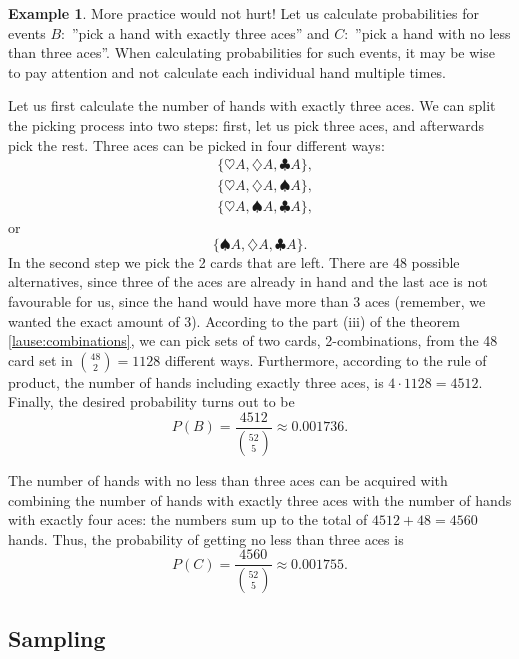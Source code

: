 \documentclass[12pt,a4paper,leqno]{report}
\theoremstyle{plain}
\theoremstyle{definition}
\newtheorem{esim}[equation]{Example}
\begin{document}
\begin{esim}
\label{esim:aces}
More practice would not hurt! Let us calculate probabilities for events $B:$ ''pick a hand with exactly three aces'' and $C:$ ''pick a hand with no less than three aces''. When calculating probabilities for such events, it may be wise to pay attention and not calculate each individual hand multiple times.

Let us first calculate the number of hands with exactly three aces. We can split the picking process into two steps: first, let us pick three aces, and afterwards pick the rest. Three aces can be picked in four different ways:
\[
\begin{split}
&\{\heartsuit A,\diamondsuit A, \clubsuit A\}, \\
&\{\heartsuit A,\diamondsuit A, \spadesuit A\}, \\
&\{\heartsuit A,\spadesuit A, \clubsuit A\}, 
\end{split}
\]
or
\[
\{\spadesuit A,\diamondsuit A, \clubsuit A\}.
\]
In the second step we pick the 2 cards that are left. There are 48 possible alternatives, since three of the aces are already in hand and the last ace is not favourable for us, since the hand would have more than  3 aces (remember, we wanted the exact amount of 3). According to the part (iii) of the theorem \ref{lause:combinations}, we can pick sets of two cards, 2-combinations, from the 48 card set in $\binom{48}{2} = 1128$ different ways. Furthermore, according to the rule of product, the number of hands including exactly three aces, is $4 \cdot 1128 = 4512$. Finally, the desired probability turns out to be 
\[
P(B) = \frac{4512}{\binom{52}{5}} \approx 0.001736.
\]

The number of hands with no less than three aces can be acquired with combining the number of hands with exactly three aces with the number of hands with exactly four aces: the numbers sum up to the total of $4512 + 48 = 4560$ hands. Thus, the probability of getting no less than three aces is
\[
P(C) = \frac{4560}{\binom{52}{5}} \approx 0.001755.
\] 
\end{esim}

\subsection{Sampling}\label{sampling} 
\end{document}
